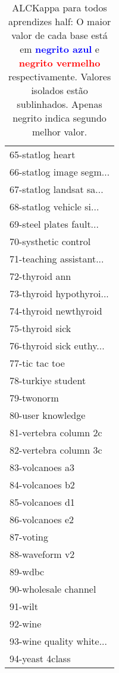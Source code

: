\begin{table}[h]
\caption{ALCKappa para todos aprendizes half: O maior valor de cada base está em \textcolor{blue}{\textbf{negrito azul}} e \textcolor{red}{\textbf{negrito vermelho}} respectivamente. Valores isolados estão sublinhados. Apenas negrito indica segundo melhor valor.}
\begin{center}\begin{tabular}{l}
 & \\ \hline 65-statlog heart &  \\
66-statlog image segm... &  \\
67-statlog landsat sa... &  \\
68-statlog vehicle si... &  \\
69-steel plates fault... &  \\
70-systhetic control &  \\
71-teaching assistant... &  \\ \hline
72-thyroid ann &  \\
73-thyroid hypothyroi... &  \\
74-thyroid newthyroid &  \\
75-thyroid sick &  \\
76-thyroid sick euthy... &  \\
77-tic tac toe &  \\
78-turkiye student &  \\ \hline
79-twonorm &  \\
80-user knowledge &  \\
81-vertebra column 2c &  \\
82-vertebra column 3c &  \\
83-volcanoes a3 &  \\
84-volcanoes b2 &  \\
85-volcanoes d1 &  \\ \hline
86-volcanoes e2 &  \\
87-voting &  \\
88-waveform v2 &  \\
89-wdbc &  \\
90-wholesale channel &  \\
91-wilt &  \\
92-wine &  \\ \hline
93-wine quality white... &  \\
94-yeast 4class &  \\\end{tabular}\label{stratsALCKappa2Allallb}
\end{center}
\end{table}